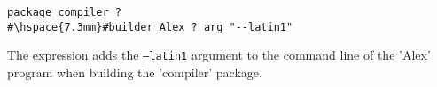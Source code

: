 \begin{lstlisting}
package compiler ?
#\hspace{7.3mm}#builder Alex ? arg "--latin1"
\end{lstlisting}

\noindent The expression adds the \texttt{--latin1} argument to the command line
of the \lst'Alex' program when building the \lst'compiler' package.

\newcommand{\itab}[1]{\hspace{0em}\rlap{#1}}
\newcommand{\tab}[1]{\hspace{.1\textwidth}\rlap{#1}}
\newcommand{\ctab}[1]{\hspace{.031\textwidth}\rlap{#1}}
\newcommand{\ptab}[1]{\hspace{.074\textwidth}\rlap{#1}}
\newcommand{\cotab}[1]{\hspace{.064\textwidth}\rlap{#1}}
\newcommand{\ttab}[1]{\hspace{.058\textwidth}\rlap{#1}}
\newcommand{\tytab}[1]{\hspace{.052\textwidth}\rlap{#1}}
\newcommand{\atab}[1]{\hspace{.102\textwidth}\rlap{#1}}

